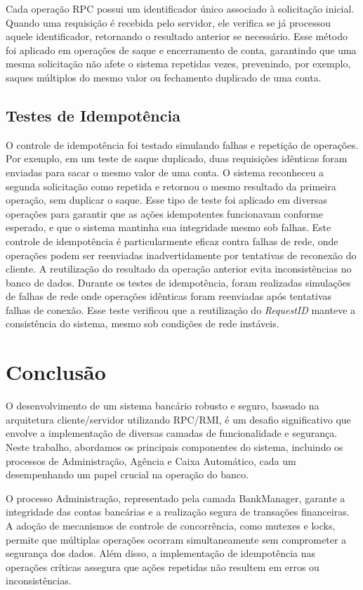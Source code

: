 \documentclass[a4paper,10pt]{article}
\begin{document}
\begin{multicols}{2}
Cada operação RPC possui um identificador único associado à solicitação inicial. Quando uma requisição é recebida pelo servidor, ele verifica se já processou aquele identificador, retornando o resultado anterior se necessário. Esse método foi aplicado em operações de saque e encerramento de conta, garantindo que uma mesma solicitação não afete o sistema repetidas vezes, prevenindo, por exemplo, saques múltiplos do mesmo valor ou fechamento duplicado de uma conta.

\subsection{Testes de Idempotência}

O controle de idempotência foi testado simulando falhas e repetição de operações. Por exemplo, em um teste de saque duplicado, duas requisições idênticas foram enviadas para sacar o mesmo valor de uma conta. O sistema reconheceu a segunda solicitação como repetida e retornou o mesmo resultado da primeira operação, sem duplicar o saque. Esse tipo de teste foi aplicado em diversas operações para garantir que as ações idempotentes funcionavam conforme esperado, e que o sistema mantinha sua integridade mesmo sob falhas.
Este controle de idempotência é particularmente eficaz contra falhas de rede, onde operações podem ser reenviadas inadvertidamente por tentativas de reconexão do cliente. A reutilização do resultado da operação anterior evita inconsistências no banco de dados.
Durante os testes de idempotência, foram realizadas simulações de falhas de rede onde operações idênticas foram reenviadas após tentativas falhas de conexão. Esse teste verificou que a reutilização do \textit{RequestID} manteve a consistência do sistema, mesmo sob condições de rede instáveis.


\section{Conclusão}

O desenvolvimento de um sistema bancário robusto e seguro, baseado na arquitetura cliente/servidor utilizando RPC/RMI, é um desafio significativo que envolve a implementação de diversas camadas de funcionalidade e segurança. Neste trabalho, abordamos os principais componentes do sistema, incluindo os processos de Administração, Agência e Caixa Automático, cada um desempenhando um papel crucial na operação do banco.

O processo Administração, representado pela camada BankManager, garante a integridade das contas bancárias e a realização segura de transações financeiras. A adoção de mecanismos de controle de concorrência, como mutexes e locks, permite que múltiplas operações ocorram simultaneamente sem comprometer a segurança dos dados. Além disso, a implementação de idempotência nas operações críticas assegura que ações repetidas não resultem em erros ou inconsistências.


\end{multicols}
\end{document}
